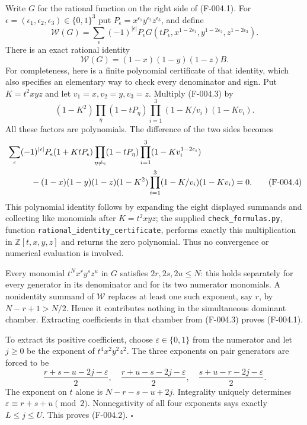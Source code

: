 Write $G$ for the rational function on the right side of (F-004.1). For
$\epsilon=(\epsilon_1,\epsilon_2,\epsilon_3)\in\{0,1\}^3$ put
$P_\epsilon=x^{\epsilon_1}y^{\epsilon_2}z^{\epsilon_3}$, and define
\[
 \mathcal W(G)=\sum_\epsilon(-1)^{|\epsilon|}P_\epsilon
 G(tP_\epsilon,x^{1-2\epsilon_1},y^{1-2\epsilon_2},z^{1-2\epsilon_3}).
\]
There is an exact rational identity
\[
 \mathcal W(G)=(1-x)(1-y)(1-z)B.                       \tag{F-004.3}
\]
For completeness, here is a finite polynomial certificate of that identity,
which also specifies an elementary way to check every denominator and sign.
Put $K=t^2xyz$ and let $v_1=x,v_2=y,v_3=z$. Multiply (F-004.3) by
\[
 (1-K^2)\prod_\eta(1-tP_\eta)
 \prod_{i=1}^3(1-K/v_i)(1-Kv_i).
\]
All these factors are polynomials. The difference of the two sides becomes
\begin{align*}
 &\sum_\epsilon(-1)^{|\epsilon|}P_\epsilon(1+KtP_\epsilon)
  \prod_{\eta\ne\epsilon}(1-tP_\eta)
  \prod_{i=1}^3(1-Kv_i^{1-2\epsilon_i})\\
 &\hspace{10mm}-(1-x)(1-y)(1-z)(1-K^2)
   \prod_{i=1}^3(1-K/v_i)(1-Kv_i)=0.                 \tag{F-004.4}
\end{align*}
This polynomial identity follows by expanding the eight displayed summands
and collecting like monomials after $K=t^2xyz$; the supplied
\texttt{check\_formulas.py}, function \texttt{rational\_identity\_certificate},
performs exactly this multiplication in $\mathbb Z[t,x,y,z]$ and returns the
zero polynomial. Thus no convergence or numerical evaluation is involved.

Every monomial $t^Nx^ry^sz^u$ in $G$ satisfies $2r,2s,2u\leq N$: this holds
separately for every generator in its denominator and for its two numerator
monomials. A nonidentity summand of $\mathcal W$ replaces at least one such
exponent, say $r$, by $N-r+1>N/2$. Hence it contributes nothing in the
simultaneous dominant chamber. Extracting coefficients in that chamber from
(F-004.3) proves (F-004.1).

To extract its positive coefficient, choose $\varepsilon\in\{0,1\}$ from
the numerator and let $j\geq0$ be the exponent of
$t^4x^2y^2z^2$. The three exponents on pair generators are forced to be
\[
 \frac{r+s-u-2j-\varepsilon}{2},\quad
 \frac{r+u-s-2j-\varepsilon}{2},\quad
 \frac{s+u-r-2j-\varepsilon}{2}.
\]
The exponent on $t$ alone is $N-r-s-u+2j$. Integrality uniquely determines
$\varepsilon\equiv r+s+u\pmod2$. Nonnegativity of all four exponents says
exactly $L\leq j\leq U$. This proves (F-004.2). \hfill$\square$


